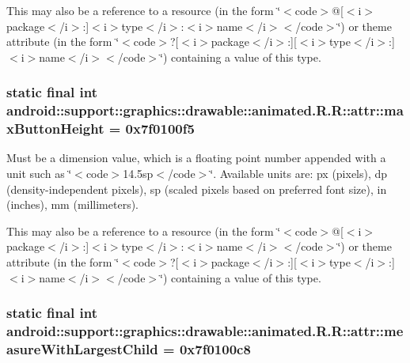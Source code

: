 This may also be a reference to a resource (in the form \char`\"{}$<$code$>$@\mbox{[}$<$i$>$package$<$/i$>$:\mbox{]}$<$i$>$type$<$/i$>$:$<$i$>$name$<$/i$>$$<$/code$>$\char`\"{}) or theme attribute (in the form \char`\"{}$<$code$>$?\mbox{[}$<$i$>$package$<$/i$>$:\mbox{]}\mbox{[}$<$i$>$type$<$/i$>$:\mbox{]}$<$i$>$name$<$/i$>$$<$/code$>$\char`\"{}) containing a value of this type. \hypertarget{classandroid_1_1support_1_1graphics_1_1drawable_1_1animated_1_1_r_1_1attr_fbcb41118a5ba87d39300332ac693deb}{
\subsubsection[{maxButtonHeight}]{\setlength{\rightskip}{0pt plus 5cm}static final int android::support::graphics::drawable::animated.R.R::attr::maxButtonHeight = 0x7f0100f5}}
\label{classandroid_1_1support_1_1graphics_1_1drawable_1_1animated_1_1_r_1_1attr_fbcb41118a5ba87d39300332ac693deb}


Must be a dimension value, which is a floating point number appended with a unit such as \char`\"{}$<$code$>$14.5sp$<$/code$>$\char`\"{}. Available units are: px (pixels), dp (density-independent pixels), sp (scaled pixels based on preferred font size), in (inches), mm (millimeters). 

This may also be a reference to a resource (in the form \char`\"{}$<$code$>$@\mbox{[}$<$i$>$package$<$/i$>$:\mbox{]}$<$i$>$type$<$/i$>$:$<$i$>$name$<$/i$>$$<$/code$>$\char`\"{}) or theme attribute (in the form \char`\"{}$<$code$>$?\mbox{[}$<$i$>$package$<$/i$>$:\mbox{]}\mbox{[}$<$i$>$type$<$/i$>$:\mbox{]}$<$i$>$name$<$/i$>$$<$/code$>$\char`\"{}) containing a value of this type. \hypertarget{classandroid_1_1support_1_1graphics_1_1drawable_1_1animated_1_1_r_1_1attr_679804194222ed3dea56c7741d4c6205}{
\subsubsection[{measureWithLargestChild}]{\setlength{\rightskip}{0pt plus 5cm}static final int android::support::graphics::drawable::animated.R.R::attr::measureWithLargestChild = 0x7f0100c8}}
\label{classandroid_1_1support_1_1graphics_1_1drawable_1_1animated_1_1_r_1_1attr_679804194222ed3dea56c7741d4c6205}



